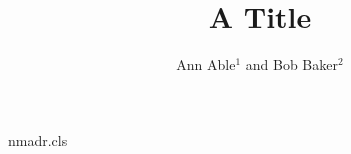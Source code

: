 \begin{filecontents*}[overwrite]{nmadr.cls}
\def\address#1{\gdef\@address{\it #1}}
\def\printaddress{\begingroup\setcounter{adr}{1}%
  \def\\{\par\stepcounter{adr}\noindent$^{\theadr}$\enspace}%
  \noindent$^{1}$\enspace\@address\par\endgroup}
\def\@maketitle{\begin{center}{\LARGE\@title\par}\vskip1em{\large\@author\par}\end{center}
  {\small\printaddress}\vskip1em}
\end{filecontents*}
\documentclass{nmadr}

\title{A Title}
\author{Ann Able$^{1}$ and Bob Baker$^{2}$}
\address{Univ A, Town \\ Univ B, City}
\maketitle
Text.

